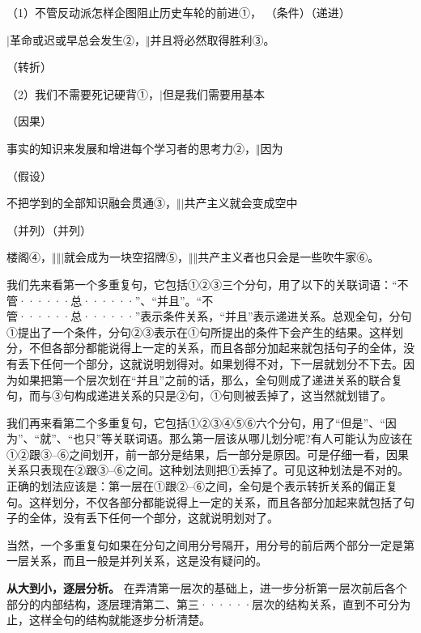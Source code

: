 （1）不管反动派怎样企图阻止历史车轮的前进①，
\noindent
（条件）\hspace{9em}（递进）

$\vert$革命或迟或早总会发生②，$\Vert$并且将必然取得胜利③。

\hspace{15em}（转折）

（2）我们不需要死记硬背①，$\vert$但是我们需要用基本

\hspace{14em}（因果）

\noindent
事实的知识来发展和增进每个学习者的思考力②，$\Vert$因为

\hspace{17em}（假设）

\noindent
不把学到的全部知识融会贯通③，$\Vert$$\vert$共产主义就会变成空中

\hspace{1em}（并列）\hspace{8em}（并列）

\noindent
楼阁④，$\Vert$$\Vert$$\vert$就会成为一块空招牌⑤，$\Vert$$\Vert$共产主义者也只会是一些吹牛家⑥。

我们先来看第一个多重复句，它包括①②③三个分句，用了以下的关联词语：“不管······总······”、“并且”。“不\\
管······总······”表示条件关系，“并且”表示递进关系。总观全句，分句①提出了一个条件，分句②③表示在①句所提出的条件下会产生的结果。这样划分，不但各部分都能说得上一定的关系，而且各部分加起来就包括句子的全体，没有丢下任何一个部分，这就说明划得对。如果划得不对，下一层就划分不下去。因为如果把第一个层次划在“并且”之前的话，那么，全句则成了递进关系的联合复句，而与③句构成递进关系的只是②句，①句则被丢掉了，这当然就划错了。

我们再来看第二个多重复句，它包括①②③④⑤⑥六个分句，用了“但是”、“因为”、“就”、“也只”等关联词语。那么第一层该从哪儿划分呢?有人可能认为应该在①②跟③--⑥之间划开，前一部分是结果，后一部分是原因。可是仔细一看，因果关系只表现在②跟③--⑥之间。这种划法则把①丢掉了。可见这种划法是不对的。正确的划法应该是：第一层在①跟②--⑥之间，全句是个表示转折关系的偏正复句。这样划分，不仅各部分都能说得上一定的关系，而且各部分加起来就包括了句子的全体，没有丢下任何一个部分，这就说明划对了。

当然，一个多重复句如果在分句之间用分号隔开，用分号的前后两个部分一定是第一层关系，而且一般是并列关系，这是没有疑问的。

\textbf{从大到小，逐层分析。}
在弄清第一层次的基础上，进一步分析第一层次前后各个部分的内部结构，逐层理清第二、第三······层次的结构关系，直到不可分为止，这样全句的结构就能逐步分析清楚。

